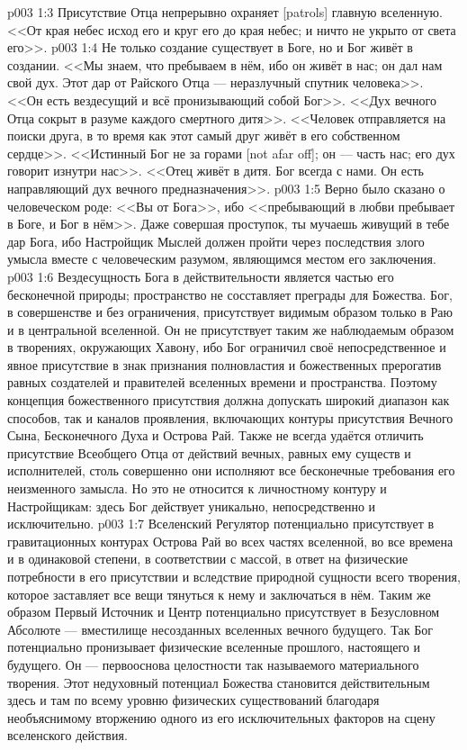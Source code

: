 \vs p003 1:3 Присутствие Отца непрерывно охраняет [patrols] главную вселенную. <<От края небес исход его и круг его до края небес; и ничто не укрыто от света его>>.
\vs p003 1:4 \pc Не только создание существует в Боге, но и Бог живёт в создании. <<Мы знаем, что пребываем в нём, ибо он живёт в нас; он дал нам свой дух. Этот дар от Райского Отца --- неразлучный спутник человека>>. <<Он есть вездесущий и всё пронизывающий собой Бог>>. <<Дух вечного Отца сокрыт в разуме каждого смертного дитя>>. <<Человек отправляется на поиски друга, в то время как этот самый друг живёт в его собственном сердце>>. <<Истинный Бог не за горами [not afar off]; он --- часть нас; его дух говорит изнутри нас>>. <<Отец живёт в дитя. Бог всегда с нами. Он есть направляющий дух вечного предназначения>>.
\vs p003 1:5 Верно было сказано о человеческом роде: <<Вы от Бога>>, ибо <<пребывающий в любви пребывает в Боге, и Бог в нём>>. Даже совершая проступок, ты мучаешь живущий в тебе дар Бога, ибо Настройщик Мыслей должен пройти через последствия злого умысла вместе с человеческим разумом, являющимся местом его заключения.
\vs p003 1:6 \pc Вездесущность Бога в действительности является частью его бесконечной природы; пространство не сосставляет преграды для Божества. Бог, в совершенстве и без ограничения, присутствует видимым образом только в Раю и в центральной вселенной. Он не присутствует таким же наблюдаемым образом в творениях, окружающих Хавону, ибо Бог ограничил своё непосредственное и явное присутствие в знак признания полновластия и божественных прерогатив равных создателей и правителей вселенных времени и пространства. Поэтому концепция божественного присутствия должна допускать широкий диапазон как способов, так и каналов проявления, включающих контуры присутствия Вечного Сына, Бесконечного Духа и Острова Рай. Также не всегда удаётся отличить присутствие Всеобщего Отца от действий вечных, равных ему существ и исполнителей, столь совершенно они исполняют все бесконечные требования его неизменного замысла. Но это не относится к личностному контуру и Настройщикам: здесь Бог действует уникально, непосредственно и исключительно.
\vs p003 1:7 \pc Вселенский Регулятор потенциально присутствует в гравитационных контурах Острова Рай во всех частях вселенной, во все времена и в одинаковой степени, в соответствии с массой, в ответ на физические потребности в его присутствии и вследствие природной сущности всего творения, которое заставляет все вещи тянуться к нему и заключаться в нём. Таким же образом Первый Источник и Центр потенциально присутствует в Безусловном Абсолюте --- вместилище несозданных вселенных вечного будущего. Так Бог потенциально пронизывает физические вселенные прошлого, настоящего и будущего. Он --- первооснова целостности так называемого материального творения. Этот недуховный потенциал Божества становится действительным здесь и там по всему уровню физических существований благодаря необъяснимому вторжению одного из его исключительных факторов на сцену вселенского действия.
